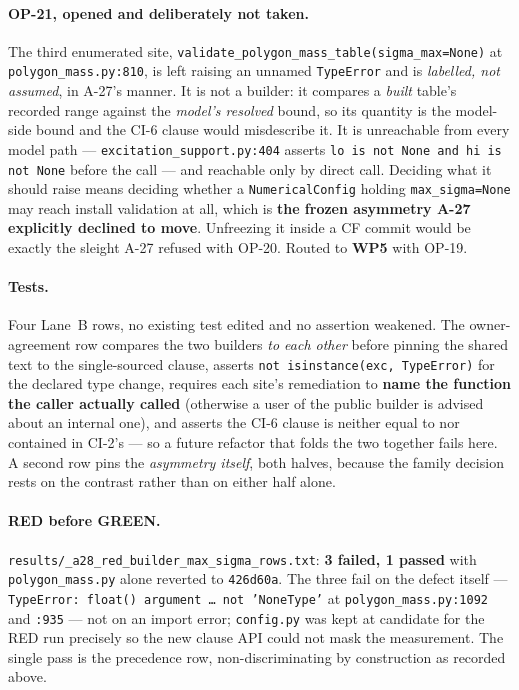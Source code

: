 \documentclass[
  10pt,
]{article}
\begin{document}
\paragraph{OP-21, opened and deliberately not taken.}
The third enumerated site, \texttt{validate\_polygon\_mass\_table(sigma\_max=None)} at \texttt{polygon\_mass.py:810}, is left raising an unnamed \texttt{TypeError} and is \emph{labelled, not assumed}, in A-27's manner. It is not a builder: it compares a \emph{built} table's recorded range against the \emph{model's resolved} bound, so its quantity is the model-side bound and the CI-6 clause would misdescribe it. It is unreachable from every model path --- \texttt{excitation\_support.py:404} asserts \texttt{lo is not None and hi is not None} before the call --- and reachable only by direct call. Deciding what it should raise means deciding whether a \texttt{NumericalConfig} holding \texttt{max\_sigma=None} may reach install validation at all, which is \textbf{the frozen asymmetry A-27 explicitly declined to move}. Unfreezing it inside a CF commit would be exactly the sleight A-27 refused with OP-20. Routed to \textbf{WP5} with OP-19.

\paragraph{Tests.}
Four Lane~B rows, no existing test edited and no assertion weakened. The owner-agreement row compares the two builders \emph{to each other} before pinning the shared text to the single-sourced clause, asserts \texttt{not isinstance(exc, TypeError)} for the declared type change, requires each site's remediation to \textbf{name the function the caller actually called} (otherwise a user of the public builder is advised about an internal one), and asserts the CI-6 clause is neither equal to nor contained in CI-2's --- so a future refactor that folds the two together fails here. A second row pins the \emph{asymmetry itself}, both halves, because the family decision rests on the contrast rather than on either half alone.

\paragraph{RED before GREEN.}
\texttt{results/\allowbreak{}\_a28\_red\_builder\_max\_sigma\_rows.txt}: \textbf{3 failed, 1 passed} with \texttt{polygon\_mass.py} alone reverted to \texttt{426d60a}. The three fail on the defect itself --- \texttt{TypeError: float() argument \ldots{} not 'NoneType'} at \texttt{polygon\_mass.py:1092} and \texttt{:935} --- not on an import error; \texttt{config.py} was kept at candidate for the RED run precisely so the new clause API could not mask the measurement. The single pass is the precedence row, non-discriminating by construction as recorded above.
\end{document}
